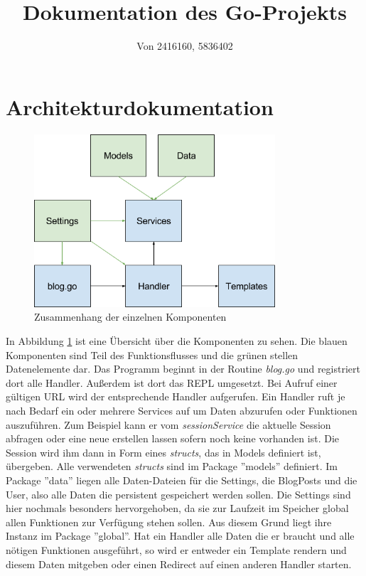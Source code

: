 \documentclass[10pt]{article}
\title{Dokumentation des Go-Projekts}
\author{Von 2416160, 5836402}
\date{}
\begin{document}
    \maketitle
	\section{Architekturdokumentation}
    \begin{figure}[h]
        \centering
        \includegraphics[width=0.8\textwidth]{Architektur.png}
        \caption{Zusammenhang der einzelnen Komponenten}
        \label{img:architektur}
    \end{figure}
    In Abbildung \ref{img:architektur} ist eine Übersicht über die Komponenten zu sehen. Die blauen Komponenten sind
    Teil des Funktionsflusses und die grünen stellen Datenelemente dar. Das Programm beginnt in der Routine
    \textit{blog.go} und registriert dort alle Handler. Außerdem ist dort das REPL umgesetzt. Bei Aufruf einer gültigen
    URL wird der entsprechende Handler aufgerufen. Ein Handler ruft je nach Bedarf ein oder mehrere Services auf um
    Daten abzurufen oder Funktionen auszuführen. Zum Beispiel kann er vom \textit{sessionService} die aktuelle Session
    abfragen oder eine neue erstellen lassen sofern noch keine vorhanden ist. Die Session wird ihm dann in Form eines
    \textit{structs}, das in Models definiert ist, übergeben. Alle verwendeten \textit{structs} sind im Package ''models''
    definiert. Im Package ''data'' liegen alle Daten-Dateien für die Settings, die BlogPosts und die User, also alle Daten
    die persistent gespeichert werden sollen. Die Settings sind hier nochmals besonders hervorgehoben, da sie zur
    Laufzeit im Speicher global allen Funktionen zur Verfügung stehen sollen. Aus diesem Grund liegt ihre Instanz im
    Package ''global''. Hat ein Handler alle Daten die er braucht und alle nötigen Funktionen ausgeführt, so wird er
    entweder ein Template rendern und diesem Daten mitgeben oder einen Redirect auf einen anderen Handler starten.
\end{document}

